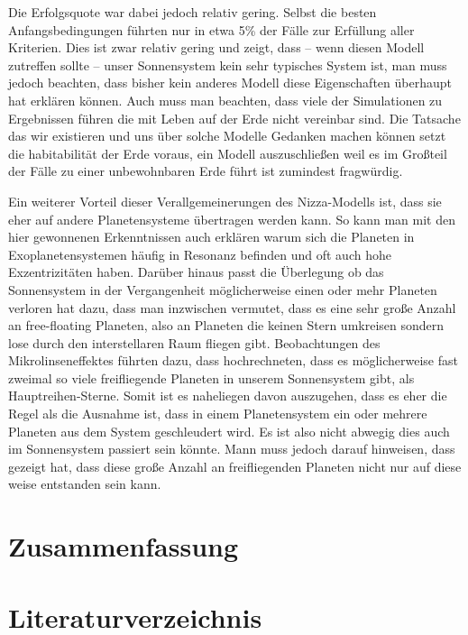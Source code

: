 \documentclass[12pt,a4paper,twoside]{article}
\renewcommand{\cite}{\citep}
\begin{document}
Die Erfolgsquote war dabei jedoch relativ gering. Selbst die besten Anfangsbedingungen führten nur in etwa 5\% der Fälle zur Erfüllung aller Kriterien\cite{Nesvorny2012}. Dies ist zwar relativ gering und zeigt, dass -- wenn diesen Modell zutreffen sollte -- unser Sonnensystem kein sehr typisches System ist, man muss jedoch beachten, dass bisher kein anderes Modell diese Eigenschaften überhaupt hat erklären können.
Auch muss man beachten, dass viele der Simulationen zu Ergebnissen führen die mit Leben auf der Erde nicht vereinbar sind. Die Tatsache das wir existieren und uns über solche Modelle Gedanken machen können setzt die habitabilität der Erde voraus, ein Modell auszuschließen weil es im Großteil der Fälle zu einer unbewohnbaren Erde führt ist zumindest fragwürdig\cite{Brasser2009}.

Ein weiterer Vorteil dieser Verallgemeinerungen des Nizza-Modells ist, dass sie eher auf andere Planetensysteme übertragen werden kann. So kann man mit den hier gewonnenen Erkenntnissen auch erklären warum sich die Planeten in Exoplanetensystemen häufig in Resonanz befinden und oft auch hohe Exzentrizitäten haben\cite{Weidenschilling1996,Rasio1996,Marcy2001,Nesvorny2012}.
Darüber hinaus passt die Überlegung ob das Sonnensystem in der Vergangenheit möglicherweise einen oder mehr Planeten verloren hat dazu, dass man inzwischen vermutet, dass es eine sehr große Anzahl an free-floating Planeten, also an Planeten die keinen Stern umkreisen sondern lose durch den interstellaren Raum fliegen gibt. %
Beobachtungen des Mikrolinseneffektes führten dazu, dass \cite{Sumi2011} hochrechneten, dass es möglicherweise fast zweimal so viele freifliegende Planeten in unserem Sonnensystem gibt, als Hauptreihen-Sterne. %
Somit ist es naheliegen davon auszugehen, dass es eher die Regel als die Ausnahme ist, dass in einem Planetensystem ein oder mehrere Planeten aus dem System geschleudert wird. Es ist also nicht abwegig dies auch im Sonnensystem passiert sein könnte.
Mann muss jedoch darauf hinweisen, dass \cite{Veras2012} gezeigt hat, dass diese große Anzahl an freifliegenden Planeten nicht nur auf diese weise entstanden sein kann.

\section{Zusammenfassung}


\newpage

\section{Literaturverzeichnis}

{}
\end{document}
